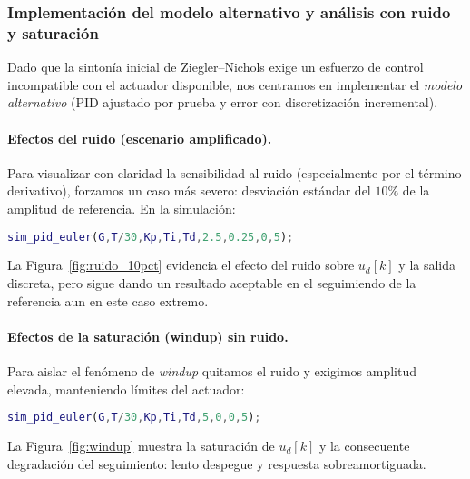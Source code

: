\subsubsection{Implementación del modelo alternativo y análisis con ruido y saturación}

Dado que la sintonía inicial de Ziegler--Nichols exige un esfuerzo de control incompatible con el actuador disponible, nos centramos en implementar el \emph{modelo alternativo} (PID ajustado por prueba y error con discretización incremental).  

\paragraph{Efectos del ruido (escenario amplificado).}
Para visualizar con claridad la sensibilidad al ruido (especialmente por el término derivativo), forzamos un caso más severo: desviación estándar del \(10\%\) de la amplitud de referencia. En la simulación:


\begin{lstlisting}[language=Matlab,breaklines=true,basicstyle=\ttfamily\footnotesize]
	sim_pid_euler(G,T/30,Kp,Ti,Td,2.5,0.25,0,5);
\end{lstlisting}

La Figura~\ref{fig:ruido_10pct} evidencia el efecto del ruido sobre \(u_d[k]\) y la salida discreta, pero sigue dando un resultado aceptable en el seguimiendo de la referencia aun en este caso extremo.



\paragraph{Efectos de la saturación (windup) sin ruido.}
Para aislar el fenómeno de \emph{windup} quitamos el ruido y exigimos amplitud elevada, manteniendo límites del actuador:
\begin{lstlisting}[language=Matlab,breaklines=true,basicstyle=\ttfamily\footnotesize]
	sim_pid_euler(G,T/30,Kp,Ti,Td,5,0,0,5);
\end{lstlisting}

La Figura~\ref{fig:windup} muestra la saturación de \(u_d[k]\) y la consecuente degradación del seguimiento: lento despegue y respuesta sobreamortiguada.

\clearpage



\clearpage